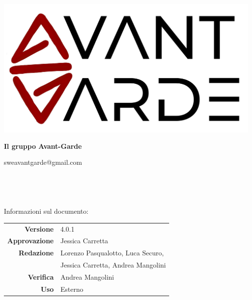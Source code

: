     \begin{titlepage}
        \begin{center}
            \includegraphics[width=\textwidth]{logo+scritta.png}

            \vspace{0.5cm}
            {\huge \textbf{Il gruppo Avant-Garde}}

            \vspace{0.4cm}
            \large{sweavantgarde@gmail.com}

            \vspace{1.5cm}
            \hrulefill\\
            \vspace{0.2cm}
            
            \textbf{\titoloDocumento}\\
            \vspace{0.1cm}
            \hrulefill

            \vfill
            Informazioni sul documento:\\
            \vspace{0.3cm}
                \begin{tabular}{ r | l }
                    \textbf{Versione} & 4.0.1\\ %
                    \textbf{Approvazione} & Jessica Carretta\\ %
                    \textbf{Redazione} & Lorenzo Pasqualotto, Luca Securo, \\
                    & Jessica Carretta, Andrea Mangolini\\ %
                    \textbf{Verifica} & Andrea Mangolini\\ %
                    \textbf{Uso} & Esterno\\ %
                \end{tabular}
        \end{center}
    \end{titlepage}
\restoregeometry
